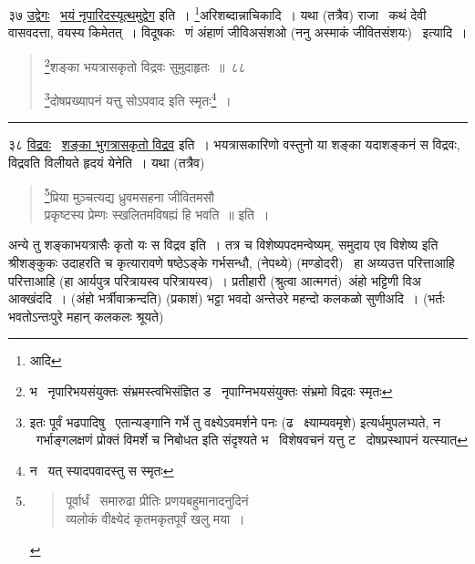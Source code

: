 \documentclass[11pt, openany]{book}
\begin{document}
३७ \underline{उद्वेगः} \textendash\ \underline{भयं नृपारिदस्यूत्थमुद्वेग} इति~। \renewcommand{\thefootnote}{3}\footnote{आदि}अरिशब्दान्नाचिकादि~। यथा (तत्रैव) राजा \textendash\ कथं देवी वासवदत्ता, वयस्य किमेतत्~। विदूषकः \textendash\ णं अंहाणं जीविअसंशओ (ननु अस्माकं जीवितसंशयः) \textendash\ इत्यादि~।

\newpage

\begin{quote}
{\na \renewcommand{\thefootnote}{1}\footnote{भ \textendash\ नृपारिभयसंयुक्तः संभ्रमस्त्वभिसंज्ञित ड \textendash\ नृपाग्निभयसंयुक्तः संभ्रमो विद्रवः स्मृतः}शङ्का भयत्रासकृतो विद्रवः सुमुदाहृतः~॥~८८

\renewcommand{\thefootnote}{2}\footnote{इतः पूर्वं भढपादिषु \textendash\ {\qt एतान्यङ्गानि गर्भे तु वक्ष्येऽवमर्शने पनः (ढ \textendash\ क्ष्याम्यवमृशे)} इत्यर्धमुपलभ्यते, न \textendash\ {\qt गर्भाङ्गलक्षणं प्रोक्तं विमर्शे च निबोधत } इति संदृश्यते भ \textendash\ विशेषवचनं यत्तु ट \textendash\ दोषप्रस्थापनं यत्स्यात्}दोषप्रख्यापनं यत्तु सोऽपवाद इति स्मृतः\renewcommand{\thefootnote}{3}\footnote{न \textendash\ यत् स्यादपवादस्तु स स्मृतः}~।}
\end{quote}

\hrule

\vspace{2mm}
३८ \underline{विद्रवः} \textendash\ \underline{शङ्का भुगत्रासकृतो विद्रव} इति~। भयत्रासकारिणो वस्तुनो या शङ्का यदाशङ्कनं स विद्रवः, विद्रवति विलीयते हृदयं येनेति~। यथा (तत्रैव) \textendash

\begin{quote}
{\qt \renewcommand{\thefootnote}{*}\footnote{\begin{quote}
पूर्वार्धं \textendash\ {\qt समारुढा प्रीतिः प्रणयबहुमानादनुदिनं\\
व्यलोकं वीक्ष्येदं कृतमकृतपूर्वं खलु मया~।}
\end{quote}}प्रिया मुञ्चत्यद्य ध्रुवमसहना जीवितमसौ\\
प्रकृष्टस्य प्रेम्णः स्खलितमविषह्यं हि भवति~॥} इति~।
\end{quote}

\noindent
अन्ये तु शङ्काभयत्रासैः कृतो यः स विद्रव इति~। तत्र च विशेष्यपदमन्वेष्यम्, समुदाय एव विशेष्य इति श्रीशङ्कुकः उदाहरति च कृत्यारावणे षष्ठेऽङ्के गर्भसन्धौ, (नेपथ्ये) (मण्डोदरी) \textendash\ हा अय्यउत्त परित्ताआहि परित्ताआहि (हा आर्यपुत्र परित्रायस्व परित्रायस्व)~। प्रतीहारी (श्रुत्वा आत्मगतं)\textendash\ अंहो भट्टिणी विअ आक्खंददि~। (अंहो भर्त्रीवाक्रन्दति) (प्रकाशं) भट्टा भवदो अन्तेउरे महन्दो कलकळो सुणीअदि~। (भर्तः भवतोऽन्तःपुरे महान् कलकलः श्रूयते)
\end{document}
